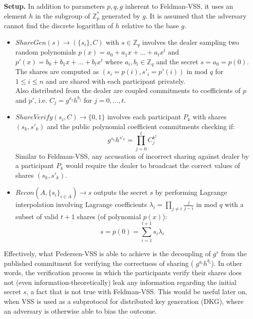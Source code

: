 \documentclass[letterpaper,twocolumn,10pt]{article}
\theoremstyle{definition}
\theoremstyle{remark}
\begin{document}
\textbf{Setup.} In addition to parameters $p,q,g$ inherent to Feldman-VSS, it uses an element $h$ in the subgroup of $\mathbb{Z}^*_p$ generated by $g$. It is assumed that the adversary cannot find the discrete logarithm of $h$ relative to the base $g$.

\begin{itemize}
\item $ShareGen(s) \rightarrow (\{s_i\}, C)$ with $s \in \mathbb{Z}_q$ involves the dealer sampling two random polynomials $p(x) = a_0 + a_1x+ \ldots+a_tx^t$ and $p'(x) = b_0 + b_1x +\ldots+b_tx^t$  where $a_i, b_i \in \mathbb{Z}_q$ and the secret $s = a_0 = p(0)$.\\
The shares are computed as $(s_i = p(i), s'_i = p'(i))$ in mod $q$ for $1 \le i \le n$ and are shared with each participant privately.\\
Also distributed from the dealer are coupled commitments to coefficients of $p$ and $p'$, i.e. $C_j = g^{a_j} h^{b_j}$ for $j = 0, ..., t$.
\item $ShareVerify(s_i, C) \rightarrow \{0, 1\}$ involves each participant $P_k$ with shares $(s_k, s'_k)$ and the public polynomial coefficient commitments checking if:
$$g^{s_k} h^{s'_k} = \prod_{j = 0}^{t} C_j^{k^j}$$
Similar to Feldman-VSS, any accusation of incorrect sharing against dealer by a participant $P_k$ would require the dealer to broadcast the correct values of shares $(s_k, s'_k)$.
\item $Recon(A, \{s_i\}_{i \in A}) \rightarrow s$ outputs the secret $s$ by performing Lagrange interpolation involving Lagrange coefficients $\lambda_i = \prod_{j \neq i} \frac{j}{j - i}$ in mod $q$ with a subset of valid $t+1$ shares (of polynomial $p(x)$):
    $$s = p(0) = \sum_{i = 1}^{t+1} s_i \lambda_i$$
\end{itemize}

Effectively, what Pedersen-VSS is able to achieve is the decoupling of $g^{s}$ from the published commitment for verifying the correctness of sharing ( $g^{a_i} h^{b_i}$). In other words, the verification process in which the participants verify their shares does not (even information-theoretically) leak any information regarding the initial secret $s$, a fact that is not true with Feldman-VSS. This would be useful later on, when VSS is used as a subprotocol for distributed key generation (DKG), where an adversary is otherwise able to bias the outcome.
\end{document}
